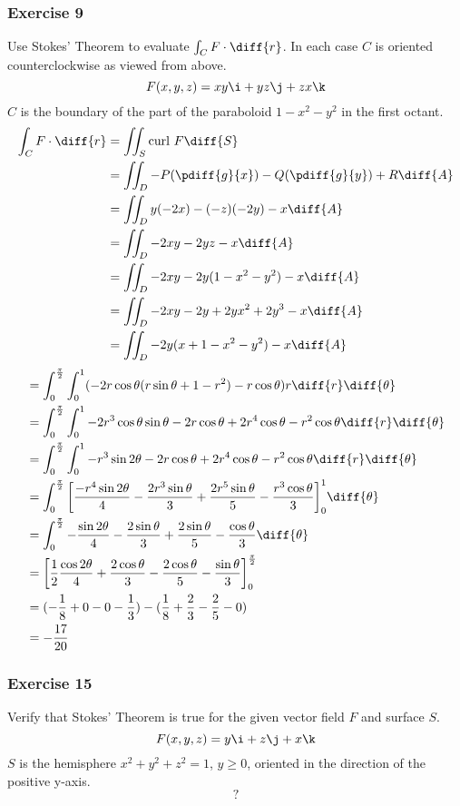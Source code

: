 \documentclass{math}
\begin{document}
\subsubsection*{Exercise 9}
Use Stokes' Theorem to evaluate \( \int_{C}F\cdot\diff{r} \). In each case
\( C \) is oriented counterclockwise as viewed from above.
\[ F(x,y,z) = xy\i+yz\j+zx\k \]
\( C \) is the boundary of the part of the paraboloid \( 1-x^2-y^2 \) in the
first octant.
\begin{align*}
  \int_{C}F\cdot\diff{r} &= \iint_{S}\text{curl}~F\diff{S} \\
  &= \iint_{D}-P(\pdiff{g}{x})-Q(\pdiff{g}{y})+R\diff{A} \\
  &= \iint_{D}y(-2x)-(-z)(-2y)-x\diff{A} \\
  &= \iint_{D}-2xy-2yz-x\diff{A} \\
  &= \iint_{D}-2xy-2y(1-x^2-y^2)-x\diff{A} \\
  &= \iint_{D}-2xy-2y+2yx^2+2y^3-x\diff{A} \\
  &= \iint_{D}-2y(x+1-x^2-y^2)-x\diff{A} \\
\end{align*}
\begin{align*}
  &= \int_{0}^{\frac{\pi}{2}}\int_{0}^{1}
    (-2r\cos\theta(r\sin\theta+1-r^2)-r\cos\theta)r\diff{r}\diff{\theta} \\
  &= \int_{0}^{\frac{\pi}{2}}\int_{0}^{1}
    -2r^3\cos\theta\sin\theta-2r\cos\theta+2r^4\cos\theta-r^2\cos\theta
    \diff{r}\diff{\theta} \\
  &= \int_{0}^{\frac{\pi}{2}}\int_{0}^{1}
    -r^3\sin2\theta-2r\cos\theta+2r^4\cos\theta-r^2\cos\theta
    \diff{r}\diff{\theta} \\
  &= \int_{0}^{\frac{\pi}{2}}
    \bigg[\frac{-r^4\sin2\theta}{4}-\frac{2r^3\sin\theta}{3}+
    \frac{2r^5\sin\theta}{5}-\frac{r^3\cos\theta}{3}\bigg]_{0}^{1}
    \diff{\theta} \\
  &= \int_{0}^{\frac{\pi}{2}}
    -\frac{\sin2\theta}{4}-\frac{2\sin\theta}{3}+\frac{2\sin\theta}{5}-
    \frac{\cos\theta}{3}\diff{\theta} \\
  &= \bigg[\frac{1}{2}\frac{\cos2\theta}{4}+\frac{2\cos\theta}{3}-
    \frac{2\cos\theta}{5}-\frac{\sin\theta}{3}\bigg]_{0}^{\frac{\pi}{2}} \\
  &= (-\frac{1}{8}+0-0-\frac{1}{3})-(\frac{1}{8}+\frac{2}{3}-\frac{2}{5}-0) \\
  &= -\frac{17}{20}
\end{align*}

\subsubsection*{Exercise 15}
Verify that Stokes' Theorem is true for the given vector field \( F \) and
surface \( S \).
\[ F(x,y,z) = y\i+z\j+x\k \]
\( S \) is the hemisphere \( x^2+y^2+z^2 = 1 \), \( y\ge0 \), oriented in the
direction of the positive y-axis.
\[ ? \]
\end{document}
